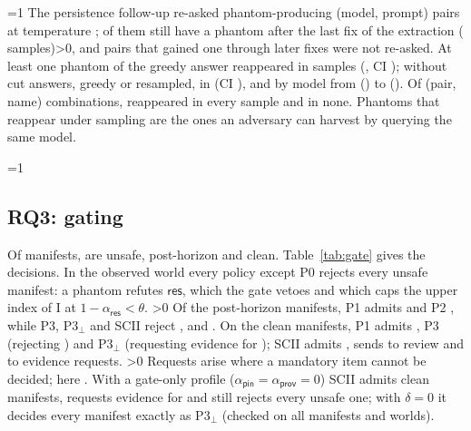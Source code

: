 \documentclass[conference]{IEEEtran}
\newif\ifpilot     \pilotfalse      %
\providecommand{\rHasPersist}{0}\providecommand{\rHasFamCmp}{0}\providecommand{\rHasExample}{0}
\providecommand{\rHasPostHorizon}{0}\providecommand{\rHasValidation}{0}\providecommand{\rHasLookups}{0}\providecommand{\rHasKappa}{0}\providecommand{\rValAllIdentical}{0}\providecommand{\rExMasked}{0}\providecommand{\rSweepSame}{0}\providecommand{\rSqOptEqAge}{0}
\newcommand{\sres}{\mathsf{res}}
\newcommand{\spin}{\mathsf{pin}}
\newcommand{\sprov}{\mathsf{prov}}
\begin{document}
\ifnum\rHasPersist=1
\ifpilot The persistence follow-up re-asked \rPersistPrompts{} phantom-producing (model, prompt) pairs of the small
models (\rPersistN{} samples at temperature \rResampleTemp).\else The persistence follow-up re-asked
\rPersistAsked{} phantom-producing (model, prompt) pairs at temperature \rResampleTemp; \rPersistPrompts{} of them
still have a phantom after the last fix of the extraction (\rPersistN{} samples)\ifnum\rPersistUnasked>0{}, and
\rPersistUnasked{} pairs that gained one through later fixes were not re-asked\fi.\fi{} At least one phantom of the greedy answer reappeared in
\rPersistK{} samples (\rPersist, CI \rPersistCI)\ifpilot\else; without cut answers, greedy or resampled, in
\rPersistNoTrunc{} (CI \rPersistNoTruncCI), and by model from \rPersistMin{} (\rPersistMinModel) to \rPersistMax{}
(\rPersistMaxModel)\fi. Of \rPersistNames{} (pair, name) combinations, \rPersistAlways{}
reappeared in every sample and \rPersistNever{} in none. Phantoms that reappear under sampling are the ones an
adversary can harvest by querying the same model.
\fi


\ifnum\rHasPostHorizon=1
\begin{table}[t]
\centering
\caption{Post-horizon matches: earliest horizon $h$ of the models that wrote the name, creation of the record it now
resolves to, and earliest commit of the repository that the record names.}
\label{tab:posthorizon}
\scriptsize
\setlength{\tabcolsep}{2pt}

\end{table}
\fi

\subsection{RQ3: gating}
\label{sec:rq3}
Of \rNManifest{} manifests, \rNManU{} are unsafe, \rNManH{} post-horizon and \rNManC{} clean. Table~\ref{tab:gate}
gives the decisions. In the observed world every policy except P0 rejects every unsafe manifest: a phantom refutes
$\sres$, which the gate vetoes and which caps the upper index of I at $1-\alpha_{\sres}<\theta$.
\ifnum\rNManH>0
Of the \rNManH{} post-horizon manifests, P1 admits \rGPOneHAdmit{} and P2 \rGPTwoHAdmit, while P3, P3$_\bot$ and
SCII reject \rGPThreeHReject, \rGPThreeUHReject{} and \rGSciiHReject.
\fi
On the \rNManC{} clean manifests, P1 admits \rGPOneCAdmit{}, P3 \rGPThreeCAdmit{} (rejecting \rGPThreeCReject) and
P3$_\bot$ \rGPThreeUCAdmit{} (requesting evidence for \rGPThreeUCRequest); SCII admits \rGSciiCAdmit, sends
\rGSciiCReview{} to review and \rGSciiCRequest{} to evidence requests.
\ifnum\rGSciiCRequest>0
Requests arise where a mandatory item cannot be decided; here \rReqCauses.
\fi
With a gate-only profile ($\alpha_{\spin}=\alpha_{\sprov}=0$) SCII admits \rGoCAdmit{} clean manifests, requests
evidence for \rGoCRequest{} and still rejects every unsafe one; with $\delta=0$ it decides every manifest exactly as
P3$_\bot$\ifnum{} (checked on all manifests and worlds)\fi.
\end{document}
